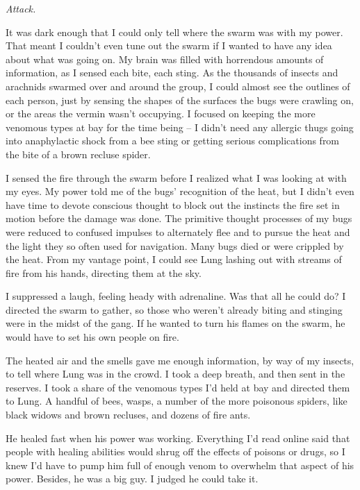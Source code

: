 \emph{Attack.}



It was dark enough that I could only tell where the swarm was with my power.  That meant I couldn't even tune out the swarm if I wanted to have any idea about what was going on.  My brain was filled with horrendous amounts of information, as I sensed each bite, each sting.  As the thousands of insects and arachnids swarmed over and around the group, I could almost see the outlines of each person, just by sensing the shapes of the surfaces the bugs were crawling on, or the areas the vermin wasn't occupying.  I focused on keeping the more venomous types at bay for the time being – I didn't need any allergic thugs going into anaphylactic shock from a bee sting or getting serious complications from the bite of a brown recluse spider.



I sensed the fire through the swarm before I realized what I was looking at with my eyes.  My power told me of the bugs' recognition of the heat, but I didn't even have time to devote conscious thought to block out the instincts the fire set in motion before the damage was done.  The primitive thought processes of my bugs were reduced to confused impulses to alternately flee and to pursue the heat and the light they so often used for navigation.  Many bugs died or were crippled by the heat.  From my vantage point, I could see Lung lashing out with streams of fire from his hands, directing them at the sky.



I suppressed a laugh, feeling heady with adrenaline.  Was that all he could do?  I directed the swarm to gather, so those who weren't already biting and stinging were in the midst of the gang.  If he wanted to turn his flames on the swarm, he would have to set his own people on fire.



The heated air and the smells gave me enough information, by way of my insects, to tell where Lung was in the crowd.  I took a deep breath, and then sent in the reserves.  I took a share of the venomous types I'd held at bay and directed them to Lung.  A handful of bees, wasps, a number of the more poisonous spiders, like black widows and brown recluses, and dozens of fire ants.



He healed fast when his power was working.  Everything I'd read online said that people with healing abilities would shrug off the effects of poisons or drugs, so I knew I'd have to pump him full of enough venom to overwhelm that aspect of his power.  Besides, he was a big guy.  I judged he could take it.



